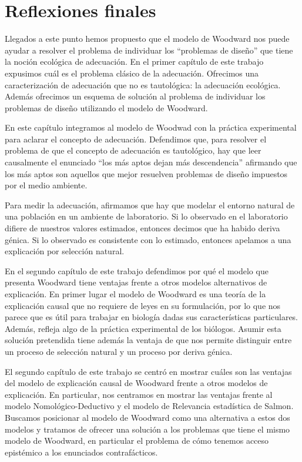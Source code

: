 
\chapter*{Reflexiones finales}

\noindent Llegados a este punto hemos propuesto que el modelo de Woodward nos puede ayudar a resolver el problema de individuar los ``problemas de diseño'' que tiene la noción ecológica de adecuación. En el primer capítulo de este trabajo expusimos cuál es el problema clásico de la adecuación. Ofrecimos una caracterización de adecuación que no es tautológica: la adecuación ecológica. Además ofrecimos un esquema de solución al problema de individuar los problemas de diseño utilizando el modelo de Woodward.

En este capítulo integramos al modelo de Woodwad con la práctica experimental para aclarar el concepto de adecuación. Defendimos que, para resolver el problema de que el concepto de adecuación es tautológico, hay que leer causalmente el enunciado ``los más aptos dejan más descendencia'' afirmando que los más aptos son aquellos que mejor resuelven problemas de diseño impuestos por el medio ambiente.

Para medir la adecuación, afirmamos que hay que modelar el entorno natural de una población en un ambiente de laboratorio. Si lo observado en el laboratorio difiere de nuestros valores estimados, entonces decimos que ha habido deriva génica. Si lo observado es consistente con lo estimado, entonces apelamos a una explicación por selección natural.

En el segundo capítulo de este trabajo defendimos por qué el modelo que presenta Woodward tiene ventajas frente a otros modelos alternativos de explicación. En primer lugar el modelo de Woodward es una teoría de la explicación causal que no requiere de leyes en su formulación, por lo que nos parece que es útil para trabajar en biología dadas sus características particulares. Además, refleja algo de la práctica experimental de los biólogos. Asumir esta solución pretendida tiene además la ventaja de que nos permite distinguir entre un proceso de selección natural y un proceso por deriva génica.

El segundo capítulo de este trabajo se centró en mostrar cuáles son las ventajas del modelo de explicación causal de Woodward frente a otros modelos de explicación. En particular, nos centramos en mostrar las ventajas frente al modelo Nomológico-Deductivo y el modelo de Relevancia estadística de Salmon. Buscamos posicionar al modelo de Woodward como una alternativa a estos dos modelos y tratamos de ofrecer una solución a los problemas que tiene el mismo modelo de Woodward, en particular el problema de cómo tenemos acceso epistémico a los enunciados contrafácticos.

